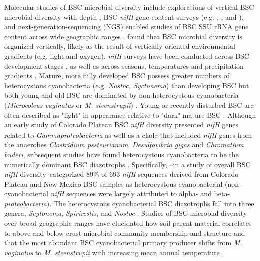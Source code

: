 Molecular studies of BSC microbial diversity include explorations of vertical BSC microbial diversity with depth \cite{Garcia_Pichel_2003}, BSC \textit{nifH} gene content surveys (e.g. \citet{14766579}, \citet{Yeager_2012}, \citet{Yeager} and \citet{Steppe_1996}), and next-generation-sequencing (NGS) enabled studies of BSC SSU rRNA gene content across wide geographic ranges \cite{Garcia_Pichel_2013, Steven_2013}. \citet{Garcia_Pichel_2003} found that BSC microbial diversity is organized vertically, likely as the result of vertically oriented environmental gradients (e.g. light and oxygen). \textit{nifH} surveys have been conducted across BSC development stages \cite{14766579}, as well as across seasons, temperatures and precipitation gradients \cite{Yeager_2012}. Mature, more fully developed BSC possess greater numbers of heterocystous cyanobacteria (e.g. \textit{Nostoc, Syctonema}) than developing BSC but both young and old BSC are dominated by non-heterocystous cyanobacteria (\textit{Microcoleus vaginatus} or \textit{M. steenstrupii}) \cite{14766579, Garcia_Pichel_2013}. Young or recently disturbed BSC are often described as "light" in appearance relative to "dark" mature BSC \cite{Belnap_2002}.  Although an early study of Colorado Plateau BSC \textit{nifH} diversity presented \textit{nifH} genes related to \textit{Gammaproteobacteria} as well as a clade that included \textit{nifH} genes from the anaerobes \textit{Clostridium pssteurianum}, \textit{Desulfovibrio gigas} and \textit{Chromatium buderi}, subsequent studies have found heterocystous cyanobacteria to be the numerically dominant BSC diazotrophs \cite{Yeager, 14766579, Yeager_2012}. Specifically, \citet{Yeager}--in a study of overall BSC \textit{nifH} diversity--categorized 89\% of 693 \textit{nifH} sequences derived from Colorado Plateau and New Mexico BSC samples as heterocystous cyanobacterial (non-cyanobacterial \textit{nifH} sequences were largely attributed to alpha- and beta- \textit{proteobacteria}). The heterocystous cyanobacterial BSC diazotrophs fall into three genera, \textit{Scytonema}, \textit{Spirirestis}, and \textit{Nostoc} \cite{Yeager, Yeager_2012}. Studies of BSC microbial diversity over broad geographic ranges have elucidated how soil parent material correlates to above and below crust microbial community membership and structure \cite{Steven_2013} and that the most abundant BSC cyanobacterial primary producer shifts from \textit{M. vaginatus} to \textit{M. steenstrupii} with increasing mean annual temperature \cite{Garcia_Pichel_2013}.

